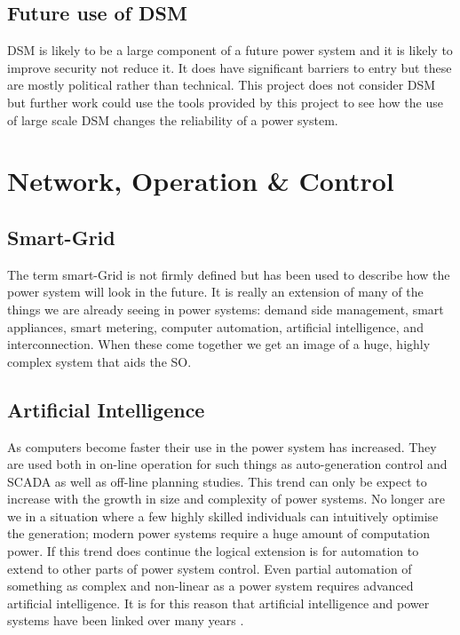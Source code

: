 \documentclass[a4paper,oneside,12pt]{report}
\begin{document}
\subsection{Future use of DSM}

DSM is likely to be a large component of a future power system and it is likely to improve security not reduce it. It does have significant barriers to entry but these are mostly political rather than technical. This project does not consider DSM but further work could use the tools provided by this project to see how the use of large scale DSM changes the reliability of a power system.

\section{Network, Operation \& Control}

\subsection{Smart-Grid}

The term smart-Grid is not firmly defined but has been used to describe how the power system will look in the future. It is really an extension of many of the things we are already seeing in power systems: demand side management, smart appliances, smart metering, computer automation, artificial intelligence, and interconnection. When these come together we get an image of a huge, highly complex system that aids the SO.

\subsection{Artificial Intelligence}

As computers become faster their use in the power system has increased. They are used both in on-line operation for such things as auto-generation control and SCADA as well as off-line planning studies. This trend can only be expect to increase with the growth in size and complexity of power systems. No longer are we in a situation where a few highly skilled individuals can intuitively optimise the generation; modern power systems require a huge amount of computation power. If this trend does continue the logical extension is for automation to extend to other parts of power system control. Even partial automation of something as complex and non-linear as a power system requires advanced artificial intelligence. It is for this reason that artificial intelligence and power systems have been linked over many years \cite{Warwick1997}.
\end{document}
